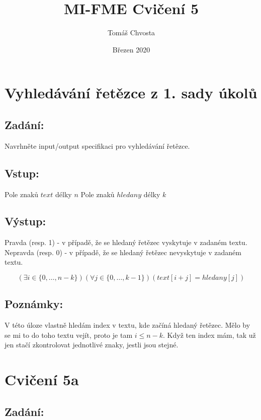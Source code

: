 \documentclass{article}
\title{MI-FME Cvičení 5}
\author{Tomáš Chvosta}
\date{Březen 2020}
\begin{document}
\maketitle

\section{Vyhledávání řetězce z 1. sady úkolů}

\subsection{Zadání:}

Navrhněte input/output specifikaci pro vyhledávání řetězce.

\subsection{Vstup:}
Pole znaků $text$ délky $n$ \newline Pole znaků $hledany$ délky $k$

\subsection{Výstup:}
Pravda (resp. 1) - v případě, že se hledaný řetězec vyskytuje v zadaném textu. \newline
Nepravda (resp. 0) - v případě, že se hledaný řetězec nevyskytuje v zadaném textu.

$$(\exists i \in \{0,\dots,n-k\})(\forall j \in \{0,\dots,k-1\})(text[i+j] = hledany[j])$$

\subsection{Poznámky:}

V této úloze vlastně hledám index v textu, kde začíná hledaný řetězec. Mělo by se mi to do toho textu vejít, proto je tam $i \leq n - k$. Když ten index mám, tak už jen stačí zkontrolovat jednotlivé znaky, jestli jsou stejné.

\section{Cvičení 5a}

\subsection{Zadání:}
\end{document}
